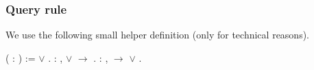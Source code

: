 \documentclass[12pt]{report}
\begin{document}
\subsubsection{Query rule}



 We use the following small helper definition
    (only for technical reasons). \begin{coqdoccode}
\coqdocnoindent
{}  (  : ) :=  \ensuremath{\lor} .\coqdoceol
\coqdocemptyline
\coqdocnoindent
{}  :\coqdoceol
\coqdocindent{1.00em}
\coqdockw{\ensuremath{\forall}}  ,  \ensuremath{\lor}  \ensuremath{\rightarrow}   .\coqdoceol
 \coqdocnoindent
{}  :\coqdoceol
\coqdocindent{1.00em}
\coqdockw{\ensuremath{\forall}}  ,    \ensuremath{\rightarrow}  \ensuremath{\lor} .\coqdoceol
 \coqdocemptyline
\end{coqdoccode}
\end{document}
